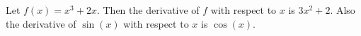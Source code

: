 Let $f(x) = x^{3} + 2x$.
Then the derivative of $f$ with respect to $x$ is $3x^{2} + 2$.
Also the derivative of $\sin(x)$ with respect to $x$ is $\cos(x)$.